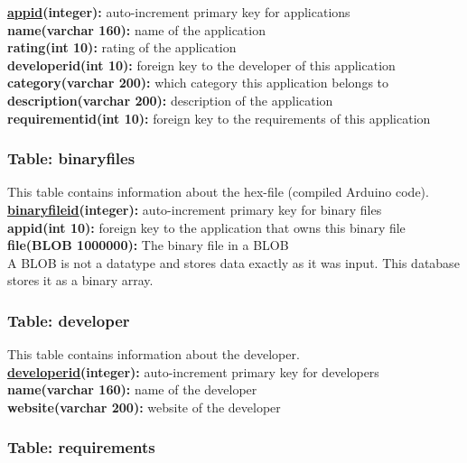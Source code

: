 			{\bf \underline{appid}(integer):} auto-increment primary key for applications  \\
			\textbf{name(varchar 160):} name of the application \\
			\textbf{rating(int 10):} rating of the application \\
			\textbf{developerid(int 10):} foreign key to the developer of this application \\
			\textbf{category(varchar 200):} which category this application belongs to \\
			\textbf{description(varchar 200):} description of the application \\
			\textbf{requirementid(int 10):} foreign key to the requirements of this application \\

		\subsubsection{Table: binaryfiles}

			This table contains information about the hex-file (compiled Arduino code). \\
			
			{\bf \underline{binaryfileid}(integer):} auto-increment primary key for binary files \\
			\textbf{appid(int 10):} foreign key to the application that owns this binary file \\
			\textbf{file(BLOB 1000000):} The binary file in a BLOB \\

			A BLOB is not a datatype and stores data exactly as it was input. This database stores it as a binary array.

		\subsubsection{Table: developer}

			This table contains information about the developer.\\
			
			{\bf \underline{developerid}(integer):} auto-increment primary key for developers \\
			\textbf{name(varchar 160):} name of the developer \\
			\textbf{website(varchar 200):} website of the developer \\

		\subsubsection{Table: requirements}

